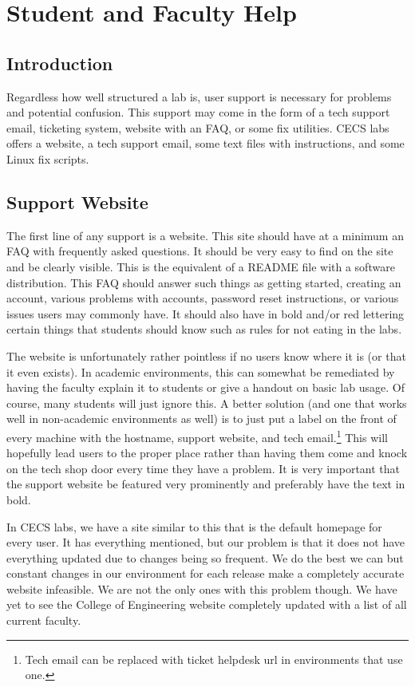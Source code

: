 \section{Student and Faculty Help}\label{sec:student_faculty_help}
\subsection{Introduction}
Regardless how well structured a lab is, user support is necessary for problems and potential confusion.  This support may come in the form of a tech support email, ticketing system, website with an FAQ, or some fix utilities.  CECS labs offers a website, a tech support email, some text files with instructions, and some Linux fix scripts.
\subsection{Support Website}
The first line of any support is a website.  This site should have at a minimum an FAQ with frequently asked questions.  It should be very easy to find on the site and be clearly visible.  This is the equivalent of a README file with a software distribution.  This FAQ should answer such things as getting started, creating an account, various problems with accounts, password reset instructions, or various issues users may commonly have.  It should also have in bold and/or red lettering certain things that students should know such as rules for not eating in the labs. 

The website is unfortunately rather pointless if no users know where it is (or that it even exists).  In academic environments, this can somewhat be remediated by having the faculty explain it to students or give a handout on basic lab usage.  Of course, many students will just ignore this.  A better solution (and one that works well in non-academic environments as well) is to just put a label on the front of every machine with the hostname, support website, and tech email.\footnote{Tech email can be replaced with ticket helpdesk url in environments that use one.}  This will hopefully lead users to the proper place rather than having them come and knock on the tech shop door every time they have a problem.  It is very important that the support website be featured very prominently and preferably have the text in bold.  

In CECS labs, we have a site similar to this that is the default homepage for every user. It has everything mentioned, but our problem is that it does not have everything updated due to changes being so frequent. We do the best we can but constant changes in our environment for each release make a completely accurate website infeasible. We are not the only ones with this problem though. We have yet to see the College of Engineering website completely updated with a list of all current faculty.  
